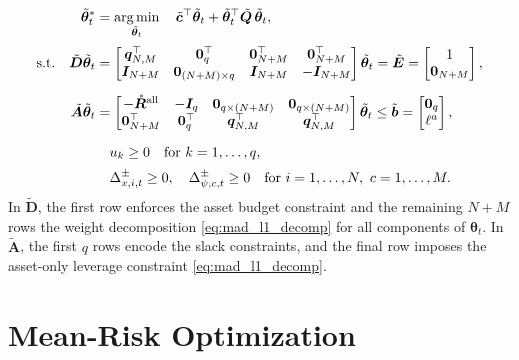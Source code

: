 \begin{equation}
\begin{aligned}
    \tilde{\bm{\theta}}_t^* &= \operatorname*{arg\,min}_{\tilde{\bm{\theta}}_t} \quad
    \tilde{\bm{c}}^\top \tilde{\bm{\theta}}_t + \tilde{\bm{\theta}}_t^\top \tilde{\bm{Q}}\, \tilde{\bm{\theta}}_t, \\[2pt]
    \text{s.t.} \quad
    \tilde{\bm{D}} \tilde{\bm{\theta}}_t &=
    \begin{bmatrix} \bm{q}_{N,M}^\top & \bm{0}_q^\top & \bm{0}_{N+M}^\top & \bm{0}_{N+M}^\top \\
    \bm{I}_{N+M} & \bm{0}_{(N+M) \times q} & \bm{I}_{N+M} & -\bm{I}_{N+M} \end{bmatrix} \tilde{\bm{\theta}}_t
    = \tilde{\bm{E}} = \begin{bmatrix} 1 \\ \bm{0}_{N+M} \end{bmatrix}, \\[6pt]
    \tilde{\bm{A}} \tilde{\bm{\theta}}_t &=
    \begin{bmatrix} -\mathring{\bm{R}}^{\text{all}} & -\bm{I}_q & \bm{0}_{q \times (N+M)} & \bm{0}_{q \times (N+M)} \\
    \bm{0}_{N+M}^\top & \bm{0}_q^\top & \bm{q}_{N,M}^\top & \bm{q}_{N,M}^\top \end{bmatrix} \tilde{\bm{\theta}}_t
    \le \tilde{\bm{b}} = \begin{bmatrix} \bm{0}_q \\ \ell^a \end{bmatrix}, \\[6pt]
    & \quad u_k \ge 0 \quad \text{for } k = 1, \dots, q, \\[2pt]
    & \quad \Delta_{x,i,t}^\pm \ge 0,\quad \Delta_{\psi,c,t}^\pm \ge 0
    \quad \text{for } i = 1, \dots, N,\ c = 1, \dots, M.
\end{aligned}
\end{equation}
In $\tilde{\bm{D}}$, the first row enforces the asset budget constraint and the remaining $N+M$ rows the weight
decomposition \eqref{eq:mad_l1_decomp} for all components of $\bm{\theta}_t$. In $\tilde{\bm{A}}$, the first $q$ rows
encode the slack constraints, and the final row imposes the asset-only leverage constraint \eqref{eq:mad_l1_decomp}.

\section{Mean-Risk Optimization} \label{app:mad_mean_risk}

